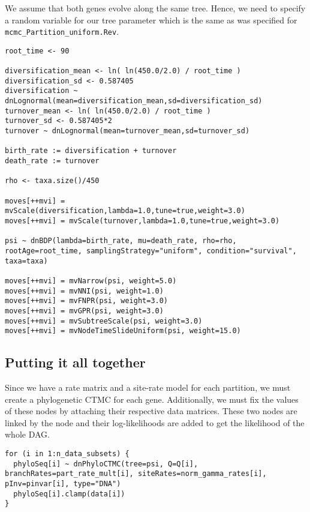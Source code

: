 We assume that both genes evolve along the same tree.
Hence, we need to specify a random variable for our tree parameter which is the same as was specified for {\tt mcmc\_Partition\_uniform.Rev}.
{\tt \begin{snugshade*}
\begin{lstlisting}
root_time <- 90

diversification_mean <- ln( ln(450.0/2.0) / root_time )
diversification_sd <- 0.587405
diversification ~ dnLognormal(mean=diversification_mean,sd=diversification_sd) 
turnover_mean <- ln( ln(450.0/2.0) / root_time )
turnover_sd <- 0.587405*2
turnover ~ dnLognormal(mean=turnover_mean,sd=turnover_sd) 

birth_rate := diversification + turnover
death_rate := turnover

rho <- taxa.size()/450

moves[++mvi] = mvScale(diversification,lambda=1.0,tune=true,weight=3.0)
moves[++mvi] = mvScale(turnover,lambda=1.0,tune=true,weight=3.0)

psi ~ dnBDP(lambda=birth_rate, mu=death_rate, rho=rho, rootAge=root_time, samplingStrategy="uniform", condition="survival", taxa=taxa)

moves[++mvi] = mvNarrow(psi, weight=5.0)
moves[++mvi] = mvNNI(psi, weight=1.0)
moves[++mvi] = mvFNPR(psi, weight=3.0)
moves[++mvi] = mvGPR(psi, weight=3.0)
moves[++mvi] = mvSubtreeScale(psi, weight=3.0)
moves[++mvi] = mvNodeTimeSlideUniform(psi, weight=15.0)
\end{lstlisting}
\end{snugshade*}}


\subsection{Putting it all together}

Since we have a rate matrix and a site-rate model for each partition, we must create a phylogenetic CTMC for each gene. 
Additionally, we must fix the values of these nodes by attaching their respective data matrices.
These two nodes are linked by the  node and their log-likelihoods are added to get the likelihood of the whole DAG.
{\tt \begin{snugshade*}
\begin{lstlisting}
for (i in 1:n_data_subsets) {
  phyloSeq[i] ~ dnPhyloCTMC(tree=psi, Q=Q[i], branchRates=part_rate_mult[i], siteRates=norm_gamma_rates[i], pInv=pinvar[i], type="DNA")
  phyloSeq[i].clamp(data[i])
}
\end{lstlisting}
\end{snugshade*}}


